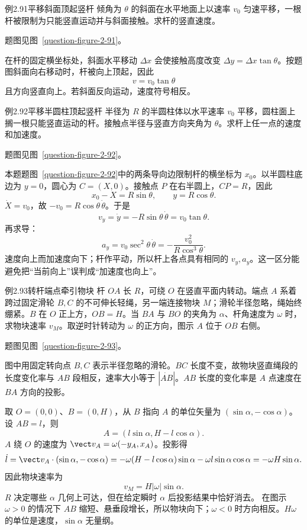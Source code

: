 \KinematicKeepSpace{9cm}
\begin{origexamplebox}{例2.91\quad 平移斜面顶起竖杆}
倾角为 $\theta$ 的斜面在水平地面上以速率 $v_0$ 匀速平移，一根杆被限制为只能竖直运动并与斜面接触。求杆的竖直速度。
\par 题图见图~\ref{question-figure-2-91}。
\KQuestionDN
\end{origexamplebox}
\begin{xesolution}
在杆的固定横坐标处，斜面水平移动 $\Delta x$ 会使接触高度改变 $\Delta y=\Delta x\tan\theta$。按题图斜面向右移动时，杆被向上顶起，因此
\MovingConstraintDiagram
\[
\boxed{v=v_0\tan\theta}
\]
且方向竖直向上。若斜面反向运动，速度符号相反。
\end{xesolution}

\begin{origexamplebox}{例2.92\quad 平移半圆柱顶起竖杆}
半径为 $R$ 的半圆柱体以水平速率 $v_0$ 平移，圆柱面上搁一根只能竖直运动的杆。接触点半径与竖直方向夹角为 $\theta$。求杆上任一点的速度和加速度。
\par 题图见图~\ref{question-figure-2-92}。
\KQuestionDO
\end{origexamplebox}
\begin{xesolution}
本题题图~\ref{question-figure-2-92}中的两条导向边限制杆的横坐标为 $x_0$。以半圆柱底边为 $y=0$，圆心为 $C=(X,0)$。接触点 $P$ 在右半圆上，$CP=R$，因此
\[
x_0-X=R\sin\theta,\qquad y=R\cos\theta.
\]
$\dot X=v_0$，故 $-v_0=R\cos\theta\,\dot\theta$。于是
\[
\boxed{v_y=\dot y=-R\sin\theta\,\dot\theta=v_0\tan\theta}.
\]
再求导：
\[
\boxed{a_y=v_0\sec^2\theta\,\dot\theta
=-\frac{v_0^2}{R\cos^3\theta}}.
\]
速度向上而加速度向下；杆作平动，所以杆上各点具有相同的 $v_y,a_y$。这一区分能避免把“当前向上”误判成“加速度也向上”。
\end{xesolution}

\KinematicKeepSpace{10cm}
\begin{origexamplebox}{例2.93\quad 转杆端点牵引物块}
杆 $OA$ 长 $R$，可绕 $O$ 在竖直平面内转动。端点 $A$ 系着跨过固定滑轮 $B,C$ 的不可伸长轻绳，另一端连接物块 $M$；滑轮半径忽略，绳始终绷紧。$B$ 在 $O$ 正上方，$OB=H$。当 $BA$ 与 $BO$ 的夹角为 $\alpha$、杆角速度为 $\omega$ 时，求物块速率 $v_M$。取逆时针转动为 $\omega$ 的正方向，图示 $A$ 位于 $OB$ 右侧。
\par 题图见图~\ref{question-figure-2-93}。
\KQuestionDP
\end{origexamplebox}
\begin{xesolution}
图中用固定转向点 $B,C$ 表示半径忽略的滑轮。$BC$ 长度不变，故物块竖直绳段的长度变化率与 $AB$ 段相反，速率大小等于 $|\dot{AB}|$。$AB$ 长度的变化率是 $A$ 点速度在 $BA$ 方向的投影。
\RodPulleyDiagram

取 $O=(0,0)$、$B=(0,H)$，从 $B$ 指向 $A$ 的单位矢量为 $(\sin\alpha,-\cos\alpha)$。设 $AB=l$，则
\[
A=(l\sin\alpha,H-l\cos\alpha).
\]
$A$ 绕 $O$ 的速度为 $\vect v_A=\omega(-y_A,x_A)$。投影得
\[
\dot l=\vect v_A\cdot(\sin\alpha,-\cos\alpha)
=-\omega(H-l\cos\alpha)\sin\alpha
-\omega l\sin\alpha\cos\alpha
=-\omega H\sin\alpha.
\]
因此物块速率为
\[
\boxed{v_M=H|\omega|\sin\alpha}.
\]
$R$ 决定哪些 $\alpha$ 几何上可达，但在给定瞬时 $\alpha$ 后投影结果中恰好消去。
在图示 $\omega>0$ 的情况下 $AB$ 缩短、悬垂段增长，所以物块向下；$\omega<0$ 时方向相反。$H\omega$ 的单位是速度，$\sin\alpha$ 无量纲。
\end{xesolution}
